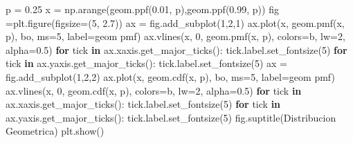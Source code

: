 \documentclass[
  letterpaper,
  DIV=11,
  numbers=noendperiod]{scrreprt}
\newenvironment{Shaded}{\begin{snugshade}}{\end{snugshade}}
\newcommand{\ControlFlowTok}[1]{\textcolor[rgb]{0.00,0.23,0.31}{\textbf{#1}}}
\newcommand{\DecValTok}[1]{\textcolor[rgb]{0.68,0.00,0.00}{#1}}
\newcommand{\FloatTok}[1]{\textcolor[rgb]{0.68,0.00,0.00}{#1}}
\newcommand{\KeywordTok}[1]{\textcolor[rgb]{0.00,0.23,0.31}{\textbf{#1}}}
\newcommand{\NormalTok}[1]{\textcolor[rgb]{0.00,0.23,0.31}{#1}}
\newcommand{\OperatorTok}[1]{\textcolor[rgb]{0.37,0.37,0.37}{#1}}
\newcommand{\StringTok}[1]{\textcolor[rgb]{0.13,0.47,0.30}{#1}}
\begin{document}
\begin{Shaded}
\begin{Highlighting}[]
\NormalTok{p }\OperatorTok{=} \FloatTok{0.25}
\NormalTok{x }\OperatorTok{=}\NormalTok{ np.arange(geom.ppf(}\FloatTok{0.01}\NormalTok{, p),geom.ppf(}\FloatTok{0.99}\NormalTok{, p))}
\NormalTok{fig }\OperatorTok{=}\NormalTok{plt.figure(figsize}\OperatorTok{=}\NormalTok{(}\DecValTok{5}\NormalTok{, }\FloatTok{2.7}\NormalTok{))}
\NormalTok{ax }\OperatorTok{=}\NormalTok{ fig.add\_subplot(}\DecValTok{1}\NormalTok{,}\DecValTok{2}\NormalTok{,}\DecValTok{1}\NormalTok{)}
\NormalTok{ax.plot(x, geom.pmf(x, p), }\StringTok{\textquotesingle{}bo\textquotesingle{}}\NormalTok{, ms}\OperatorTok{=}\DecValTok{5}\NormalTok{, label}\OperatorTok{=}\StringTok{\textquotesingle{}geom pmf\textquotesingle{}}\NormalTok{)}
\NormalTok{ax.vlines(x, }\DecValTok{0}\NormalTok{, geom.pmf(x, p), colors}\OperatorTok{=}\StringTok{\textquotesingle{}b\textquotesingle{}}\NormalTok{, lw}\OperatorTok{=}\DecValTok{2}\NormalTok{, alpha}\OperatorTok{=}\FloatTok{0.5}\NormalTok{)}
\ControlFlowTok{for}\NormalTok{ tick }\KeywordTok{in}\NormalTok{ ax.xaxis.get\_major\_ticks():}
\NormalTok{  tick.label.set\_fontsize(}\DecValTok{5}\NormalTok{)}
\ControlFlowTok{for}\NormalTok{ tick }\KeywordTok{in}\NormalTok{ ax.yaxis.get\_major\_ticks():}
\NormalTok{  tick.label.set\_fontsize(}\DecValTok{5}\NormalTok{) }
\NormalTok{ax }\OperatorTok{=}\NormalTok{ fig.add\_subplot(}\DecValTok{1}\NormalTok{,}\DecValTok{2}\NormalTok{,}\DecValTok{2}\NormalTok{)}
\NormalTok{ax.plot(x, geom.cdf(x, p), }\StringTok{\textquotesingle{}bo\textquotesingle{}}\NormalTok{, ms}\OperatorTok{=}\DecValTok{5}\NormalTok{, label}\OperatorTok{=}\StringTok{\textquotesingle{}geom pmf\textquotesingle{}}\NormalTok{)}
\NormalTok{ax.vlines(x, }\DecValTok{0}\NormalTok{, geom.cdf(x, p), colors}\OperatorTok{=}\StringTok{\textquotesingle{}b\textquotesingle{}}\NormalTok{, lw}\OperatorTok{=}\DecValTok{2}\NormalTok{, alpha}\OperatorTok{=}\FloatTok{0.5}\NormalTok{)}
\ControlFlowTok{for}\NormalTok{ tick }\KeywordTok{in}\NormalTok{ ax.xaxis.get\_major\_ticks():}
\NormalTok{  tick.label.set\_fontsize(}\DecValTok{5}\NormalTok{)}
\ControlFlowTok{for}\NormalTok{ tick }\KeywordTok{in}\NormalTok{ ax.yaxis.get\_major\_ticks():}
\NormalTok{  tick.label.set\_fontsize(}\DecValTok{5}\NormalTok{)}
\NormalTok{fig.suptitle(}\StringTok{\textquotesingle{}Distribucion Geometrica\textquotesingle{}}\NormalTok{)}
\NormalTok{plt.show()}
\end{Highlighting}
\end{Shaded}
\end{document}
